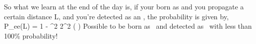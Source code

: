 {So what we learn at the end of the day is, if your born as \nue and you propagate a certain distance L, and you're detected as an \nue, the probability is given by,
\be 
P_{ee}(L) = 1 - \sin^2 2\theta \sin^2 \left(  \right)
\ee 
Possible to be born as \nue\ and detected as \nue\ with less than 100\% probability!

}



